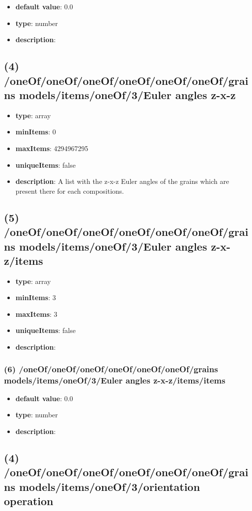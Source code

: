 \begin{itemize}[leftmargin=7em]\item {\bf default value}: 0.0
\item {\bf type}: number
\item {\bf description}: 
\end{itemize}\subsection{(4) /oneOf/oneOf/oneOf/oneOf/oneOf/oneOf/grains models/items/oneOf/3/Euler angles z-x-z}
\begin{itemize}[leftmargin=4em]\item {\bf type}: array
\item {\bf minItems}: 0
\item {\bf maxItems}: 4294967295
\item {\bf uniqueItems}: false
\item {\bf description}: A list with the z-x-z Euler angles of the grains which are present there for each compositions.
\end{itemize}\subsection{(5) /oneOf/oneOf/oneOf/oneOf/oneOf/oneOf/grains models/items/oneOf/3/Euler angles z-x-z/items}
\begin{itemize}[leftmargin=5em]\item {\bf type}: array
\item {\bf minItems}: 3
\item {\bf maxItems}: 3
\item {\bf uniqueItems}: false
\item {\bf description}: 
\end{itemize}\subsubsection{(6) /oneOf/oneOf/oneOf/oneOf/oneOf/oneOf/grains models/items/oneOf/3/Euler angles z-x-z/items/items}
\begin{itemize}[leftmargin=6em]\item {\bf default value}: 0.0
\item {\bf type}: number
\item {\bf description}: 
\end{itemize}\subsection{(4) /oneOf/oneOf/oneOf/oneOf/oneOf/oneOf/grains models/items/oneOf/3/orientation operation}
